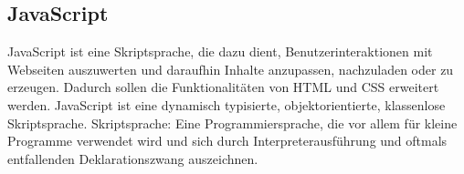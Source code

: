 \subsection{JavaScript}
JavaScript ist eine Skriptsprache, die dazu dient, Benutzerinteraktionen mit Webseiten auszuwerten und daraufhin Inhalte anzupassen, nachzuladen oder zu erzeugen. Dadurch sollen die Funktionalitäten von HTML und CSS erweitert werden. JavaScript ist eine dynamisch typisierte, objektorientierte, klassenlose Skriptsprache.
Skriptsprache: Eine Programmiersprache, die vor allem für kleine Programme verwendet wird und sich durch Interpreterausführung und oftmals entfallenden Deklarationszwang auszeichnen.
